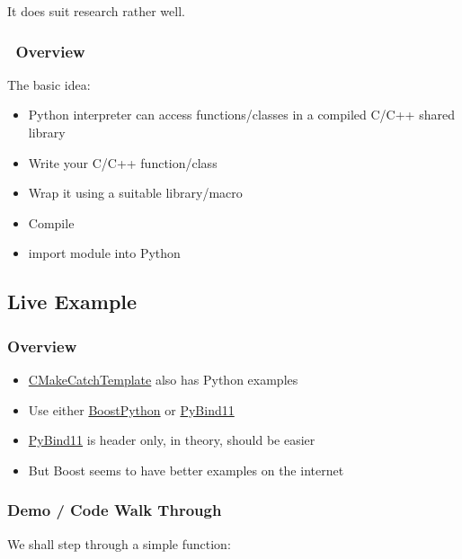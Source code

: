 It does suit research rather well.

\subsubsection{~Overview}\label{overview-1}

The basic idea:

\begin{itemize}
\itemsep1pt\parskip0pt
\item
  Python interpreter can access functions/classes in a compiled C/C++
  shared library
\item
  Write your C/C++ function/class
\item
  Wrap it using a suitable library/macro
\item
  Compile
\item
  import module into Python
\end{itemize}

\subsection{Live Example}\label{live-example}

\subsubsection{Overview}\label{overview-2}

\begin{itemize}
\itemsep1pt\parskip0pt
\item
  \href{https://github.com/MattClarkson/CMakeCatchTemplate}{CMakeCatchTemplate}
  also has Python examples
\item
  Use either
  \href{https://www.boost.org/doc/libs/1_68_0/libs/python/doc/html/index.html}{BoostPython}
  or \href{https://github.com/pybind/pybind11}{PyBind11}
\item
  \href{https://github.com/pybind/pybind11}{PyBind11} is header only, in
  theory, should be easier
\item
  But Boost seems to have better examples on the internet
\end{itemize}

\subsubsection{Demo / Code Walk Through}\label{demo-code-walk-through}

We shall step through a simple function:

